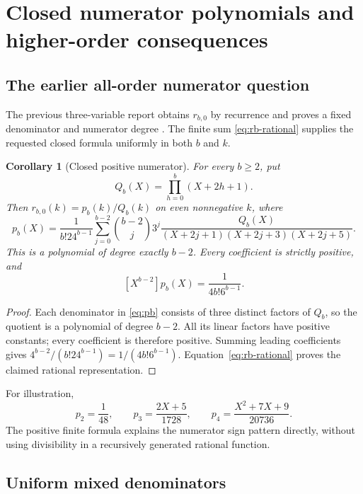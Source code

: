 \documentclass[11pt,letterpaper]{article}
\numberwithin{equation}{section}
\theoremstyle{plain}
\newtheorem{corollary}[theorem]{Corollary}
\theoremstyle{definition}
\theoremstyle{remark}
\begin{document}


\section{Closed numerator polynomials and higher-order consequences}
\label{sec:numerators}

\subsection{The earlier all-order numerator question}

The previous three-variable report obtains $r_{b,0}$ by recurrence and proves a fixed denominator and numerator degree \cite{RepoSector}. The finite sum \eqref{eq:rb-rational} supplies the requested closed formula uniformly in both $b$ and $k$.

\begin{corollary}[Closed positive numerator]\label{cor:pb}
For every $b\ge2$, put
\[
 Q_b(X)=\prod_{h=0}^b(X+2h+1).
\]
Then $r_{b,0}(k)=p_b(k)/Q_b(k)$ on even nonnegative $k$, where
\begin{equation}\label{eq:pb}
 p_b(X)=\frac1{b!24^{b-1}}
 \sum_{j=0}^{b-2}\binom{b-2}{j}3^j
 \frac{Q_b(X)}{(X+2j+1)(X+2j+3)(X+2j+5)}.
\end{equation}
This is a polynomial of degree exactly $b-2$. Every coefficient is strictly positive, and
\begin{equation}\label{eq:pb-leading}
 [X^{b-2}]p_b(X)=\frac1{4b!6^{b-1}}.
\end{equation}
\end{corollary}
\begin{proof}
Each denominator in \eqref{eq:pb} consists of three distinct factors of $Q_b$, so the quotient is a polynomial of degree $b-2$. All its linear factors have positive constants; every coefficient is therefore positive. Summing leading coefficients gives
$4^{b-2}/(b!24^{b-1})=1/(4b!6^{b-1})$. Equation~\eqref{eq:rb-rational} proves the claimed rational representation.
\end{proof}

For illustration,
\[
 p_2=\frac1{48},\qquad
 p_3=\frac{2X+5}{1728},\qquad
 p_4=\frac{X^2+7X+9}{20736}.
\]
The positive finite formula explains the numerator sign pattern directly, without using divisibility in a recursively generated rational function.

\subsection{Uniform mixed denominators}
\end{document}

